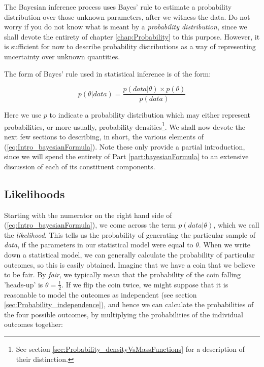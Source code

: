 \documentclass[11pt,fullpage]{book}
\begin{document}
The Bayesian inference process uses Bayes' rule to estimate a probability distribution over those unknown parameters, after we witness the data. Do not worry if you do not know what is meant by a \textit{probability distribution}, since we shall devote the entirety of chapter \ref{chap:Probability} to this purpose. However, it is sufficient for now to describe probability distributions as a way of representing uncertainty over unknown quantities.

The form of Bayes' rule used in statistical inference is of the form:

\begin{equation}\label{eq:Intro_bayesianFormula}
p(\theta|data) = \frac{p(data|\theta)\times p(\theta)}{p(data)}
\end{equation}

Here we use $p$ to indicate a probability distribution which may either represent probabilities, or more usually, probability densities\footnote{See section \ref{sec:Probability_densityVsMassFunctions} for a description of their distinction.}. We shall now devote the next few sections to describing, in short, the various elements of (\ref{eq:Intro_bayesianFormula}). Note these only provide a partial introduction, since we will spend the entirety of Part \ref{part:bayesianFormula} to an extensive discussion of each of its constituent components.

\subsection{Likelihoods}\label{sec:Intro_likelihoods}
Starting with the numerator on the right hand side of (\ref{eq:Intro_bayesianFormula}), we come across the term $p(data|\theta)$, which we call the \textit{likelihood}. This tells us the probability of generating the particular sample of \textit{data}, if the parameters in our statistical model were equal to $\theta$. When we write down a statistical model, we can generally calculate the probability of particular outcomes, so this is easily obtained. Imagine that we have a coin that we believe to be fair. By \textit{fair}, we typically mean that the probability of the coin falling 'heads-up' is $\theta=\frac{1}{2}$. If we flip the coin twice, we might suppose that it is reasonable to model the outcomes as independent (see section \ref{sec:Probability_independence}), and hence we can calculate the probabilities of the four possible outcomes, by multiplying the probabilities of the individual outcomes together:
\end{document}
